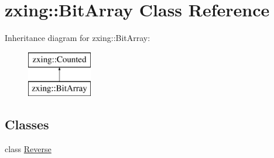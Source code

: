 \hypertarget{classzxing_1_1_bit_array}{}\section{zxing\+:\+:Bit\+Array Class Reference}
\label{classzxing_1_1_bit_array}
Inheritance diagram for zxing\+:\+:Bit\+Array\+:\begin{figure}[H]
\begin{center}
\leavevmode
\includegraphics[height=2.000000cm]{classzxing_1_1_bit_array}
\end{center}
\end{figure}
\subsection*{Classes}
\begin{DoxyCompactItemize}
\item 
class \mbox{\hyperlink{classzxing_1_1_bit_array_1_1_reverse}{Reverse}}
\end{DoxyCompactItemize}
